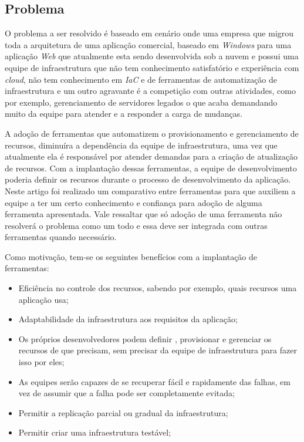 \subsection{Problema}

O problema a ser resolvido é baseado em cenário onde uma empresa que migrou toda a arquitetura de uma aplicação comercial, baseado em \textit{Windows} para uma aplicação \textit{Web} que atualmente esta sendo desenvolvida sob a nuvem e possui uma equipe de infraestrutura que não tem conhecimento satisfatório e experiência com \textit{cloud}, não tem conhecimento em \textit{IaC} e de ferramentas de automatização de infraestrutura e um outro agravante é a competição com outras atividades, como por exemplo, gerenciamento de servidores legados o que acaba demandando muito da equipe para atender e a responder a carga de mudanças.

 A adoção de ferramentas que automatizem o provisionamento e gerenciamento de recursos, diminuíra a dependência da equipe de infraestrutura, uma vez que atualmente ela é responsável por atender demandas para a criação de atualização de recursos. Com a implantação dessas ferramentas, a equipe de desenvolvimento poderia definir os recursos durante o processo de desenvolvimento da aplicação. Neste artigo foi realizado um comparativo entre ferramentas para que auxiliem a equipe a ter um certo conhecimento e confiança para adoção de alguma ferramenta apresentada. Vale ressaltar que só adoção de uma ferramenta não resolverá o problema como um todo e essa deve ser integrada com outras ferramentas quando necessário. 

  Como motivação, tem-se os seguintes benefícios com a implantação de ferramentas:  
\begin{itemize}
 \item Eficiência no controle dos recursos, sabendo por exemplo, quais recursos uma aplicação usa;
 \item Adaptabilidade da infraestrutura aos requisitos da aplicação;
 \item Os próprios desenvolvedores podem definir , provisionar e gerenciar os recursos de que precisam, sem precisar da equipe de infraestrutura para fazer isso por eles;

\item As equipes serão capazes de se recuperar fácil e rapidamente das falhas, em vez de assumir que a falha pode ser completamente evitada;

\item Permitir a replicação parcial ou gradual da infraestrutura;

\item Permitir criar uma infraestrutura testável;
\end{itemize} 


